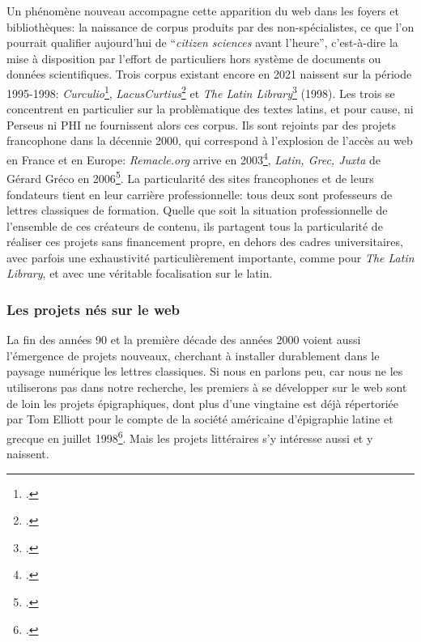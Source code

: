 Un phénomène nouveau accompagne cette apparition du web dans les foyers et bibliothèques: la naissance de corpus produits par des non-spécialistes, ce que l'on pourrait qualifier aujourd'hui de \enquote{\textit{citizen sciences} avant l'heure}, c'est-à-dire la mise à disposition par l'effort de particuliers hors système de documents ou données scientifiques. Trois corpus existant encore en 2021 naissent sur la période 1995-1998: \textit{Curculio}\footcite{hendry_curculio_1995}, \textit{LacusCurtius}\footcite{lomarcan_lacuscurtius_1999} et \textit{The Latin Library}\footcite{carey_latin_1998} (1998). Les trois se concentrent en particulier sur la problèmatique des textes latins, et pour cause, ni Perseus ni PHI ne fournissent alors ces corpus. Ils sont rejoints par des projets francophone dans la décennie 2000, qui correspond à l'explosion de l'accès au web en France et en Europe: \textit{Remacle.org} arrive en 2003\footcite{philippe_remacle_site_2008}, \textit{Latin, Grec, Juxta} de Gérard Gréco en 2006\footcite{gerard_greco_latin_2006}. La particularité des sites francophones et de leurs fondateurs tient en leur carrière professionnelle: tous deux sont professeurs de lettres classiques de formation. Quelle que soit la situation professionnelle de l'ensemble de ces créateurs de contenu, ils partagent tous la particularité de réaliser ces projets sans financement propre, en dehors des cadres universitaires, avec parfois une exhaustivité particulièrement importante, comme pour \textit{The Latin Library}, et avec une véritable focalisation sur le latin.

\subsubsection{Les projets nés sur le web}

La fin des années 90 et la première décade des années 2000 voient aussi l'émergence de projets nouveaux, cherchant à installer durablement dans le paysage numérique les lettres classiques. Si nous en parlons peu, car nous ne les utiliserons pas dans notre recherche, les premiers à se développer sur le web sont de loin les projets épigraphiques, dont plus d'une vingtaine est déjà répertoriée par Tom Elliott pour le compte de la société américaine d'épigraphie latine et grecque en juillet 1998\footcite{elliott_links_1998}. Mais les projets littéraires s'y intéresse aussi et y naissent.

